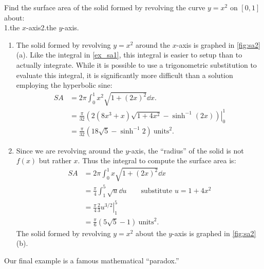 \begin{example}\label{ex_sa2}
Find the surface area of the solid formed by revolving the curve $y=x^2$ on $[0,1]$ about:\\
\null\hfill 1.\quad the $x$-axis\hfill2.\quad the $y$-axis.\hfill\null
\solution
\begin{enumerate}
	\item		The solid formed by revolving $y=x^2$ around the $x$-axis is graphed in \autoref{fig:sa2}(a). Like the integral in \autoref{ex_sa1}, this integral is easier to setup than to actually integrate. While it is possible to use a trigonometric substitution to evaluate this integral, it is significantly more difficult than a solution employing the hyperbolic sine:
\begin{align*}
	SA &= 2\pi\int_0^1 x^2\sqrt{1+(2x)^2}\dd x. \\
	&= \left.\frac{\pi}{32}\left(2(8x^3+x)\sqrt{1+4x^2}-\sinh^{-1}(2x)\right)\right|_0^1\\
	&=\frac{\pi}{32}\left(18\sqrt{5}-\sinh^{-1}2\right)\ \text{units}^2.
\end{align*}

	\item	 Since we are revolving around the $y$-axis, the ``radius'' of the solid is not $f(x)$ but rather $x$. Thus the integral to compute the surface area is:
\begin{align*}
	SA &= 2\pi\int_0^1x\sqrt{1+(2x)^2}\dd x \\
	&=	\frac{\pi}4\int_1^5 \sqrt{u}\dd u \qquad\text{substitute $u=1+4x^2$} \\
	&= \left.\frac{\pi}{4}\frac23 u^{3/2}\right|_1^5\\
	&= \frac{\pi}6\left(5\sqrt{5}-1\right)\ \text{units}^2.
\end{align*}
 The solid formed by revolving $y=x^2$ about the $y$-axis is graphed in \autoref{fig:sa2} (b).
\end{enumerate}
\end{example}

Our final example is a famous mathematical ``paradox.''

